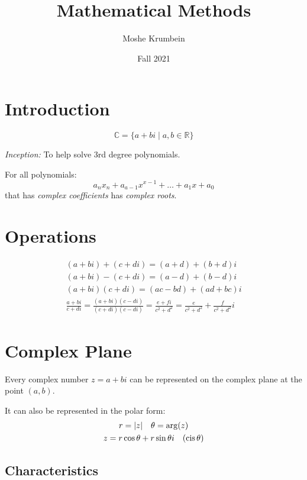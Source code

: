 \documentclass[00_complete]{subfiles}
\title{Mathematical Methods}
\author{Moshe Krumbein}
\date{Fall 2021}
\begin{document}

\section{Introduction}

\[
\mathbb{C} = \{a +bi \mid a, b \in \mathbb{R}\}
\]

\emph{Inception:} To help solve 3rd degree polynomials.

\begin{definition}
For all polynomials:
$$a_nx_n+a_{a-1}x^{x-1}+\ldots+a_1x+a_0$$
that has \emph{complex coefficients} has \emph{complex roots}.
\end{definition}

\section{Operations}

\begin{gather}
    (a+bi)+(c+di) = (a+d)+(b+d)i \\
    (a+bi)-(c+di) = (a-d)+(b-d)i \\
    (a+bi)(c+di) = (ac - bd) + (ad + bc)i \\
    \frac{a+bi}{c+di} = \frac{(a+bi)(c-di)}{(c+di)(c-di)}
    = \frac{e+fi}{c^2+d^2} = \frac{e}{c^2+d^2}+\frac{f}{c^2+d^2}i
\end{gather}

\section{Complex Plane}

Every complex number \(z=a+bi\) can be represented on the complex plane
at the point \((a,b)\).

It can also be represented in the polar form: \[
\begin{gathered}
    r=|z| \quad \theta = \arg(z) \\
    z = r \cos \theta + r \sin \theta i \quad (\operatorname{cis} \theta)\\
\end{gathered}
\]

\subsection{Characteristics}
\end{document}
